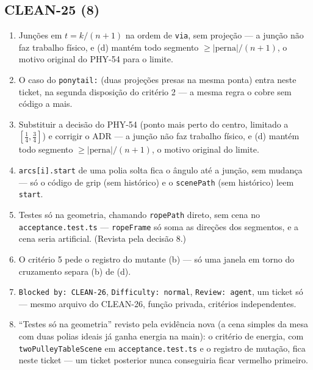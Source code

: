 \documentclass[11pt,a4paper]{article}
\begin{document}
{\small
\subsection*{CLEAN-25 (8)}
\begin{enumerate}
  \item Junções em $t = k/(n + 1)$ na ordem de \texttt{via}, sem projeção --- a
        junção não faz trabalho físico, e (d) mantém todo segmento
        $\geq |\mathrm{perna}|/(n + 1)$, o motivo original do PHY-54 para o limite.
  \item O caso do \texttt{ponytail:} (duas projeções presas na mesma ponta)
        entra neste ticket, na segunda disposição do critério 2 --- a mesma
        regra o cobre sem código a mais.
  \item Substituir a decisão do PHY-54 (ponto mais perto do centro, limitado a
        $[\frac14, \frac34]$) e corrigir o ADR --- a junção não faz trabalho
        físico, e (d) mantém todo segmento $\geq |\mathrm{perna}|/(n + 1)$, o
        motivo original do limite.
  \item \texttt{arcs[i].start} de uma polia solta fica o ângulo até a junção,
        sem mudança --- só o código de grip (sem histórico) e o
        \texttt{scenePath} (sem histórico) leem \texttt{start}.
  \item Testes só na geometria, chamando \texttt{ropePath} direto, sem cena no
        \texttt{acceptance.test.ts} --- \texttt{ropeFrame} só soma as direções
        dos segmentos, e a cena seria artificial. (Revista pela decisão 8.)
  \item O critério 5 pede o registro do mutante (b) --- só uma janela em torno
        do cruzamento separa (b) de (d).
  \item \texttt{Blocked by: CLEAN-26}, \texttt{Difficulty: normal},
        \texttt{Review: agent}, um ticket só --- mesmo arquivo do CLEAN-26,
        função privada, critérios independentes.
  \item ``Testes só na geometria'' revisto pela evidência nova (a cena simples
        da mesa com duas polias ideais já ganha energia na main): o critério de
        energia, com \texttt{twoPulleyTableScene} em
        \texttt{acceptance.test.ts} e o registro de mutação, fica neste ticket
        --- um ticket posterior nunca conseguiria ficar vermelho primeiro.
\end{enumerate}

}
\end{document}
